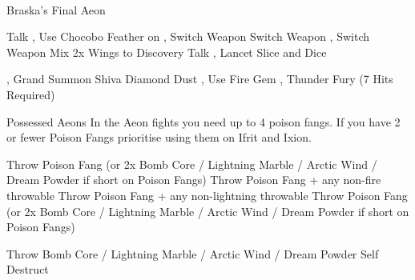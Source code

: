 \vfill\ \colbreak
\begin{battle}[180000]{Braska's Final Aeon}
	\begin{itemize}
		\tidusf Talk
		\switch{\yuna}{\rikku}, Use Chocobo Feather on \tidus
		\switch{\auron}{\yuna}, Switch Weapon
		\rikkuf Switch Weapon
		\switch{\yuna}{\lulu}, Switch Weapon
		\rikkuf Mix 2x Wings to Discovery
		\tidusf Talk
		\switch{\lulu}{\kimahri}, Lancet
		\tidusf Slice and Dice
		
		\vspace{\baselineskip}

		\switch{\rikku}{\yuna}, Grand Summon Shiva
		\shivaf Diamond Dust
		\switch{\kimahri}{\rikku}, Use Fire Gem
		\switch{\tidus}{\lulu}, Thunder Fury (7 Hits Required)
	\end{itemize}
\end{battle}
\colend
{}
\begin{battle}{Possessed  Aeons}
	In the Aeon fights you need up to 4 poison fangs. If you have 2 or fewer Poison Fangs prioritise using them on Ifrit and Ixion.
	\begin{itemize}
		\valeforf Throw Poison Fang (or 2x Bomb Core / Lightning Marble / Arctic Wind / Dream Powder if short on Poison Fangs)
		\ifritf Throw Poison Fang + any non-fire throwable
		\ixionf Throw Poison Fang + any non-lightning throwable
		\shivaf Throw Poison Fang (or 2x Bomb Core / Lightning Marble / Arctic Wind / Dream Powder if short on Poison Fangs)
		\bahamutf
			\begin{itemize}
				\rikkuf Throw Bomb Core / Lightning Marble / Arctic Wind / Dream Powder
				\switch{\yuna}{\kimahri}
				\kimahrif Self Destruct
			\end{itemize}
	\end{itemize}
\end{battle}
